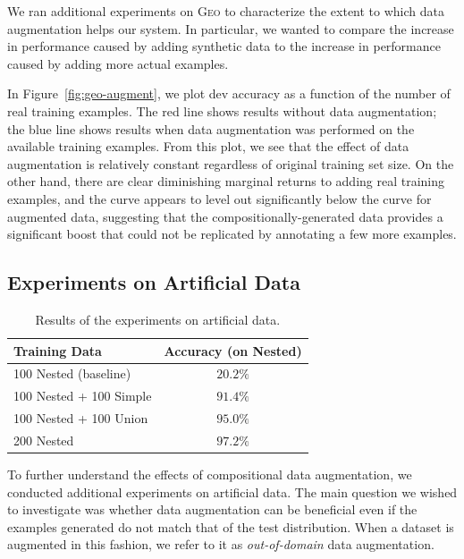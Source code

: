 \documentclass[11pt,letterpaper]{article}
\newcommand{\geo}{\textsc{Geo}\xspace}
\begin{document}
We ran additional experiments on \geo to characterize
the extent to which data augmentation helps our system.
In particular, we wanted to compare the increase in performance
caused by adding synthetic data to the 
increase in performance caused by adding more actual examples.

In Figure~\ref{fig:geo-augment}, we plot dev accuracy as a function of
the number of real training examples.  The red line
shows results without data augmentation;
the blue line shows results when data augmentation was 
performed on the available training examples.
From this plot, we see that the effect of 
data augmentation is relatively constant regardless
of original training set size.
On the other hand, there are clear diminishing marginal returns
to adding real training examples, and the curve appears to level out
significantly below the curve for augmented data,
suggesting that the compositionally-generated data
provides a significant boost that could not be replicated
by annotating a few more examples.

\subsection{Experiments on Artificial Data}
\begin{table}[t]
  \centering
  \small
  \begin{tabular}{|l|c|}
    \hline
    Training Data & Accuracy (on Nested) \\
    \hline
    100 Nested (baseline) & $20.2\%$ \\
    100 Nested + 100 Simple & $91.4\%$ \\
    100 Nested + 100 Union & $95.0\%$ \\
    200 Nested & $97.2\%$ \\
    \hline
  \end{tabular}
  \caption{Results of the experiments on artificial data.}
  \label{tab:artificial}
\end{table}

To further understand the effects of compositional data augmentation,
we conducted additional experiments on artificial data.
The main question we wished to investigate was whether
data augmentation can be beneficial even if the examples generated
do not match that of the test distribution.
When a dataset is augmented in this fashion, we refer to it
as \emph{out-of-domain} data augmentation.
\end{document}
